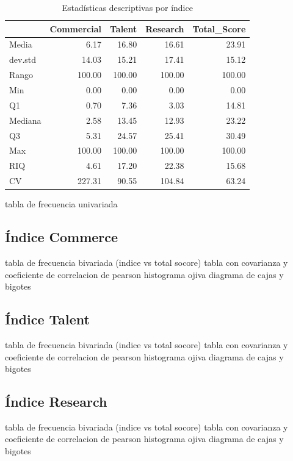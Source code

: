 \documentclass[
]{article}
\begin{document}
\begin{multicols}{2}
\renewcommand{\arraystretch}{1.5}
\begin{footnotesize}\begin{table}

\caption{\label{tab:resultados}Estadísticas descriptivas por índice}
\centering
\begin{tabular}[t]{lrrrr}
\toprule
  & Commercial & Talent & Research & Total\_Score\\
\midrule
Media & 6.17 & 16.80 & 16.61 & 23.91\\
dev.std & 14.03 & 15.21 & 17.41 & 15.12\\
Rango & 100.00 & 100.00 & 100.00 & 100.00\\
Min & 0.00 & 0.00 & 0.00 & 0.00\\
Q1 & 0.70 & 7.36 & 3.03 & 14.81\\
\addlinespace
Mediana & 2.58 & 13.45 & 12.93 & 23.22\\
Q3 & 5.31 & 24.57 & 25.41 & 30.49\\
Max & 100.00 & 100.00 & 100.00 & 100.00\\
RIQ & 4.61 & 17.20 & 22.38 & 15.68\\
CV & 227.31 & 90.55 & 104.84 & 63.24\\
\bottomrule
\end{tabular}
\end{table}

\end{footnotesize}\renewcommand{\arraystretch}{1}

tabla de frecuencia univariada

\subsection{Índice Commerce}
tabla de frecuencia bivariada (indice vs total socore)
tabla con covarianza y coeficiente de correlacion de pearson
histograma
ojiva
diagrama de cajas y bigotes


\subsection{Índice Talent}
tabla de frecuencia bivariada (indice vs total socore)
tabla con covarianza y coeficiente de correlacion de pearson
histograma
ojiva
diagrama de cajas y bigotes

\subsection{Índice Research}
tabla de frecuencia bivariada (indice vs total socore)
tabla con covarianza y coeficiente de correlacion de pearson
histograma
ojiva
diagrama de cajas y bigotes


\end{multicols}
\end{document}
